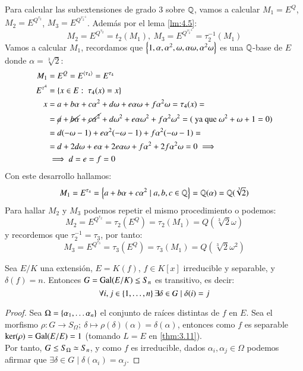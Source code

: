 \begin{eg}
\begin{enumerate}
        Para calcular las subextensiones de grado $3$ sobre $\mathbb{Q}$, vamos a calcular $M_1 = E^{Q}$, $M_2 = E^{Q^{\tau_2}}$, $M_3 = E^{Q^{\tau_2^{-1}}}$. Además por el lema \ref{lm:4.5}:
        $$
            M_2 = E^{Q^{\tau_2}} = t_2(M_1),\ M_3 = E^{Q^{\tau_2^{-1}}} = \tau_2^{-1}(M_1)
        $$
        Vamos a calcular $M_1$, recordamos que $\left\{1, \alpha, \alpha^2, \omega, \alpha \omega, \alpha^2 \omega\right\}$ es una $\mathbb{Q}$-base de $E$ donde $\alpha = \sqrt[3]{2}$:
        \begin{align*}
            M_1 &= E^Q = E^{\langle\tau_4\rangle} = E^{\tau_4}\\
            E^{\tau^4} &= \left\{x \in E:\ \tau_4(x) = x\right\}\\
            x &= a + b\alpha + c \alpha^2 + d\omega + e\alpha\omega + f\alpha^2\omega = \tau_4(x) =\\
              &= \cancel a + \cancel{b\alpha} + \cancel{c\alpha^2} + d\omega^2 + e\alpha\omega^2 + f\alpha^2\omega^2 = (\text{ ya que } \omega^2+\omega+1 = 0)\\
              &= d(-\omega -1) + e\alpha^2(-\omega - 1) + f\alpha^2(-\omega -1) =\\
              &= d + 2d\omega + e\alpha + 2e\alpha \omega + f\alpha^2 + 2f\alpha^2\omega = 0 \implies\\
              &\implies d = e = f = 0
        \end{align*}
        Con este desarrollo hallamos:
        $$
            M_1 = E^{\tau_4} = \left\{a + b\alpha + c\alpha^2 \mid a,b,c \in \mathbb{Q}\right\} = \mathbb{Q}(\alpha) = \mathbb{Q}(\sqrt[3]{2})
        $$
        Para hallar $M_2$ y $M_3$ podemos repetir el mismo procedimiento o podemos:
        $$
            M_2 = E^{Q^{\tau_2}} = \tau_2(E^Q) = \tau_2(M_1) = Q(\sqrt[3]{2} \omega)
        $$
        y recordemos que $\tau_2^{-1} = \tau_3$, por tanto:
        $$
            M_3 = E^{Q^{\tau_3}} = \tau_3(E^Q) = \tau_3(M_1) = Q(\sqrt[3]{2} \omega^2)
        $$
    \end{enumerate}
\end{eg}

\begin{pro}
    Sea $E/K$ una extensión, $E = K(f)$, $f \in K[x]$ irreducible y separable, y $\delta(f) = n$. Entonces $G = \mathrm{Gal}(E/K) \leq S_n$ es transitivo, es decir:
    $$
        \forall i,j \in \left\{1, \ldots, n\right\} \exists \delta \in G \mid \delta(i) = j
    $$
\end{pro}
\begin{proof}
    Sea $\Omega = \left\{\alpha_1, \ldots \alpha_n\right\}$ el conjunto de raíces distintas de $f$ en $E$. Sea el morfismo $\rho: G \to S_\Omega;\ \delta \mapsto \rho(\delta)(\alpha) = \delta(\alpha)$, entonces como $f$ es separable $\ker(\rho) = \mathrm{Gal}(E/E) = 1$ (tomando $L=E$ en \ref{thm:3.11}).\\

    Por tanto, $G \leq S_\Omega \simeq S_n$, y como $f$ es irreducible, dados $\alpha_i, \alpha_j \in \Omega$ podemos afirmar que $\exists \delta \in G \mid \delta(\alpha_i) = \alpha_j$.
\end{proof}

